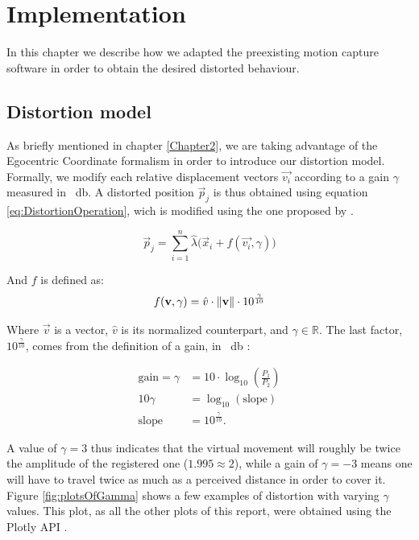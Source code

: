 
\chapter{Implementation} %

\label{Chapter3} %

In this chapter we describe how we adapted the preexisting motion capture software in order to obtain the desired distorted behaviour.

\section{Distortion model}

As briefly mentioned in chapter \ref{Chapter2}, we are taking advantage of the Egocentric Coordinate formalism in order to introduce our distortion model. Formally, we modify each relative displacement vectors $\vec{v_i}$ according to a gain $\gamma$ measured in \SI{}{\decibel}. A distorted position $\vec{p}_j$ is thus obtained using equation \ref{eq:DistortionOperation}, wich is modified using the one proposed by \cite{molla2017egocentric}.

\begin{equation}
\label{eq:DistortionOperation}
\vec{p}_j = \displaystyle\sum_{i=1}^{n} \hat{\lambda}\big(\vec{x}_i + f(\vec{v_i},\gamma )\big)
\end{equation}

\noindent
And $f$ is defined as:
\begin{equation}
\label{eq:DistortionFunction}
f(\mathbf{v},\gamma ) = \hat{v} \cdot \lVert\mathbf{v}\rVert \cdot 10^{\frac{\gamma}{10}}
\end{equation}

\noindent
Where $\vec{v}$ is a vector, $\hat{v}$ is its normalized counterpart, and $\gamma \in \mathbb{R}$. The last factor, $10^{\frac{\gamma}{10}}$, comes from the definition of a gain, in \SI{}{\decibel} \cite{book:decibel}:

\begin{align*}
    \text{gain} = \gamma &= 10 \cdot \log_{10} (\frac{P_1}{P_2})\\
    10\gamma &= \log_{10} (\text{slope})\\
    \text{slope} &= 10^{\frac{\gamma}{10}}.
\end{align*}

\noindent
A value of $\gamma = 3$ thus indicates that the virtual movement will roughly be twice the amplitude of the registered one ($1.995 \approx 2$), while a gain of $\gamma = -3$ means one will have to travel twice as much as a perceived distance in order to cover it. Figure \ref{fig:plotsOfGamma} shows a few examples of distortion with varying $\gamma $ values. This plot, as all the other plots of this report, were obtained using the Plotly API \cite{plotly}.

